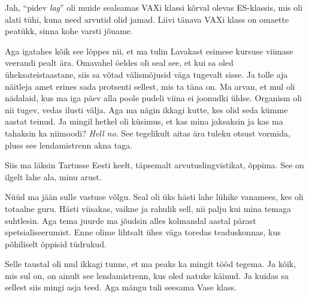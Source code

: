 
Jah, \enquote{pidev \emph{lag}} oli muide sealsamas VAXi klassi kõrval olevas 
ES-klassis, mis oli alati tühi, kuna need arvutid olid jamad. Liivi tänava 
VAXi klass on omaette peatükk, sinna kohe varsti jõuame.

Aga igatahes kõik see lõppes nii, et ma tulin Lavakast esimese kursuse viimase veerandi 
pealt ära. Omavahel öeldes oli seal see, et kui sa oled üheksateistaastane, 
siis sa  võtad välismõjusid väga tugevalt sisse. Ja tolle aja  
näitleja amet erines sada protsenti sellest, mis ta täna on. Ma arvan, et  mul 
oli nädalaid, kus ma iga päev alla poole pudeli viina ei joonudki üldse. 
Organism oli nii tugev, vedas ilusti välja. Aga ma nägin ikkagi kutte, kes olid 
seda kümme aastat teinud. Ja mingil hetkel oli küsimus, et kas mina jaksaksin 
ja kas ma tahaksin ka niimoodi? \emph{Hell no}. See tegelikult  aitas ära 
tuleku otsust vormida, pluss see lendamistrenn akna taga. 

Siis ma läksin Tartusse Eesti keelt, täpsemalt 
arvutuslingvistikat, õppima. See on ilgelt lahe ala, minu arust.


Nüüd ma jään sulle vastuse võlgu. Seal oli üks hästi lahe lühike vanamees, kes 
oli  totaalne guru. Hästi viisakas, vaikne ja rahulik sell, nii palju kui 
mina temaga suhtlesin. Aga tema juurde ma jõudsin alles kolmandal aastal pärast 
spetsialiseerumist. Enne olime lihtsalt ühes väga toredas teaduskonnas, kus 
põhiliselt õppisid tüdrukud.

Selle taustal oli mul ikkagi tunne, et ma peaks ka mingit tööd tegema. Ja kõik, 
mis sul on, on ainult see lendamistrenn, kus oled natuke käinud. Ja kuidas sa 
sellest siis mingi asja teed. Aga mängu tuli seesama Vase klass.

